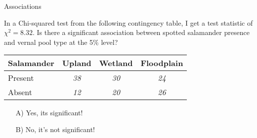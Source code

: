 \documentclass[
  ignorenonframetext,
  t]{beamer}
\begin{document}
\begin{frame}{Associations}
\protect\hypertarget{associations-5}{}

In a Chi-squared test from the following contingency table, I get a test
statistic of \(\chi^2 = 8.32\). Is there a significant association
between spotted salamander presence and vernal pool type at the 5\%
level?

\vspace{0.5cm}

\centering

\begin{tabular}{lccc}
\hline     
Salamander & Upland & Wetland & Floodplain \\ \hline
Present    & \emph{38}    & \emph{30} & \emph{24} \\   
Absent   & \emph{12}    & \emph{20} & \emph{26} \\ 
\hline
\end{tabular}

\vspace{1cm}

\begin{enumerate}[\hspace{0.5cm}A.]
  \item[A)] Yes, its significant!
  \item[B)] No, it's not significant!
\end{enumerate}


\end{frame}
\end{document}

